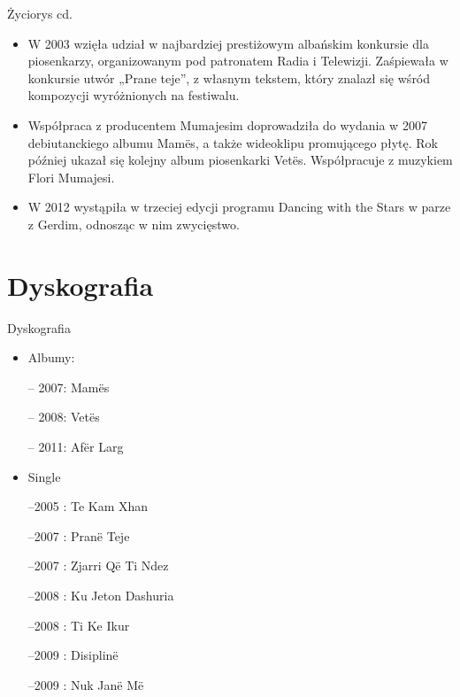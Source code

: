\documentclass{beamer}
\begin{document}
\begin{frame}{Życiorys cd.}
\begin {itemize}
\item<1> W 2003 wzięła udział w najbardziej prestiżowym albańskim konkursie dla piosenkarzy, organizowanym pod patronatem Radia i Telewizji. Zaśpiewała w konkursie utwór „Prane teje”, z własnym tekstem, który znalazł się wśród kompozycji wyróżnionych na festiwalu.
\pause
\item<1-3> Współpraca z producentem Mumajesim doprowadziła do wydania w 2007 debiutanckiego albumu Mamës, a także wideoklipu promującego płytę. Rok później ukazał się kolejny album piosenkarki Vetës. Współpracuje z muzykiem Flori Mumajesi.
\item<3> W 2012 wystąpiła w trzeciej edycji programu Dancing with the Stars w parze z Gerdim, odnosząc w nim zwycięstwo.
\end {itemize}
\end {frame}

\section{Dyskografia}
\begin{frame}{Dyskografia}
\begin {itemize}

\item Albumy:

-- 2007: Mamës

-- 2008: Vetës

-- 2011: Afër Larg
\pause

\item Single

--2005 : Te Kam Xhan

--2007 : Pranë Teje

--2007 : Zjarri Që Ti Ndez

--2008 : Ku Jeton Dashuria

--2008 : Ti Ke Ikur

--2009 : Disiplinë

--2009 : Nuk Janë Më



\end {itemize}
\end {frame}
\end{document}
